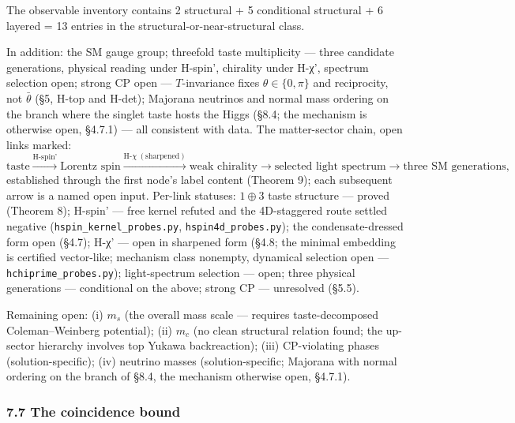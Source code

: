 \documentclass[
]{article}
\begin{document}
The observable inventory contains 2 structural + 5 conditional
structural + 6 layered = 13 entries in the structural-or-near-structural
class.

In addition: the SM gauge group; threefold taste multiplicity --- three
candidate generations, physical reading under H-spin', chirality under
H-χ', spectrum selection open; strong CP open --- \(T\)-invariance fixes
\(\theta\in\{0,\pi\}\) and reciprocity, not \(\bar\theta\) (§5, H-top
and H-det); Majorana neutrinos and normal mass ordering on the branch
where the singlet taste hosts the Higgs (§8.4; the mechanism is
otherwise open, §4.7.1) --- all consistent with data. The matter-sector
chain, open links marked:
\[\text{taste} \xrightarrow{\text{H-spin'}} \text{Lorentz spin} \xrightarrow{\text{H-}\chi\ (\text{sharpened})} \text{weak chirality} \to \text{selected light spectrum} \to \text{three SM generations},\]
established through the first node's label content (Theorem 9); each
subsequent arrow is a named open input. Per-link statuses:
\(1 \oplus 3\) taste structure --- proved (Theorem 8); H-spin' --- free
kernel refuted and the 4D-staggered route settled negative
(\texttt{hspin\_kernel\_probes.py}, \texttt{hspin4d\_probes.py}); the
condensate-dressed form open (§4.7); H-χ' --- open in sharpened form
(§4.8; the minimal embedding is certified vector-like; mechanism class
nonempty, dynamical selection open --- \texttt{hchiprime\_probes.py});
light-spectrum selection --- open; three physical generations ---
conditional on the above; strong CP --- unresolved (§5.5).

Remaining open: (i) \(m_s\) (the overall mass scale --- requires
taste-decomposed Coleman--Weinberg potential); (ii) \(m_c\) (no clean
structural relation found; the up-sector hierarchy involves top Yukawa
backreaction); (iii) CP-violating phases (solution-specific); (iv)
neutrino masses (solution-specific; Majorana with normal ordering on the
branch of §8.4, the mechanism otherwise open, §4.7.1).

\hypertarget{the-coincidence-bound}{%
\subsubsection{7.7 The coincidence bound}\label{the-coincidence-bound}}
\end{document}
